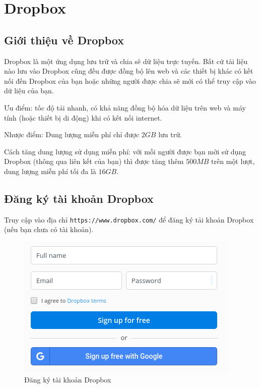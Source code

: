 \section{Dropbox}
\subsection{Giới thiệu về Dropbox}
Dropbox là một ứng dụng lưu trữ và chia sẽ dữ liệu trực tuyến. Bất cứ tài liệu nào lưu vào Dropbox cũng đều được đồng bộ lên web và các thiết bị khác có kết nối đến Dropbox của bạn hoặc những người được chia sẽ mới có thể truy cập vào dữ liệu của bạn.
\begin{list}{--}{}
\item Ưu điểm: tốc độ tải nhanh, có khả năng đồng bộ hóa dữ liệu trên web và máy tính (hoặc thiết bị di động) khi có kết nối internet.
\item Nhược điểm: Dung lượng miễn phí chỉ được $2GB$ lưu trữ.
\item Cách tăng dung lượng sử dụng miễn phí: với mỗi người được bạn mời sử dụng Dropbox (thông qua liên kết của bạn) thì được tăng thêm $500MB$ trên một lượt, dung lượng miễn phí tối đa là $16GB$.
\end{list}
\subsection{Đăng ký tài khoản Dropbox}\label{Sub:sign-up-dropbox}
Truy cập vào địa chỉ \texttt{https://www.dropbox.com/} để đăng ký tải khoản Dropbox (nếu bạn chưa có tài khoản).
\begin{figure}[!h]
\begin{center}
\includegraphics[scale=.7]{images/sign-up-dropbox.png} 
\end{center}
\caption{Đăng ký tài khoản Dropbox}\label{Fig:Sign-up-Dropbox}
\end{figure}

